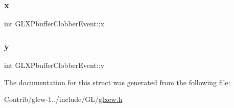 \subsubsection{\texorpdfstring{x}{x}}
{\footnotesize\ttfamily int G\+L\+X\+Pbuffer\+Clobber\+Event\+::x}

\mbox{\label{struct_g_l_x_pbuffer_clobber_event_a69eb7ac60d36ac3ec4550ac206cfc61f}} 
\subsubsection{\texorpdfstring{y}{y}}
{\footnotesize\ttfamily int G\+L\+X\+Pbuffer\+Clobber\+Event\+::y}



The documentation for this struct was generated from the following file\+:\begin{DoxyCompactItemize}
\item 
Contrib/glew-\/1../include/\+G\+L/\mbox{\hyperlink{glxew_8h}{glxew.\+h}}\end{DoxyCompactItemize}
